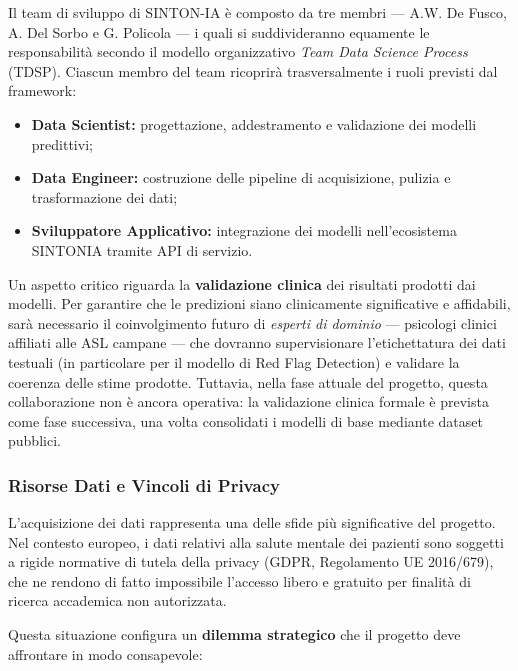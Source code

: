 Il team di sviluppo di SINTON-IA è composto da tre membri --- A.W. De Fusco, A. Del Sorbo e G. Policola --- i quali si suddivideranno equamente le responsabilità secondo il modello organizzativo \textit{Team Data Science Process} (TDSP). Ciascun membro del team ricoprirà trasversalmente i ruoli previsti dal framework:

\begin{itemize}
    \item \textbf{Data Scientist:} progettazione, addestramento e validazione dei modelli predittivi;
    \item \textbf{Data Engineer:} costruzione delle pipeline di acquisizione, pulizia e trasformazione dei dati;
    \item \textbf{Sviluppatore Applicativo:} integrazione dei modelli nell'ecosistema SINTONIA tramite API di servizio.
\end{itemize}

Un aspetto critico riguarda la \textbf{validazione clinica} dei risultati prodotti dai modelli. Per garantire che le predizioni siano clinicamente significative e affidabili, sarà necessario il coinvolgimento futuro di \textit{esperti di dominio} --- psicologi clinici affiliati alle ASL campane --- che dovranno supervisionare l'etichettatura dei dati testuali (in particolare per il modello di Red Flag Detection) e validare la coerenza delle stime prodotte. Tuttavia, nella fase attuale del progetto, questa collaborazione non è ancora operativa: la validazione clinica formale è prevista come fase successiva, una volta consolidati i modelli di base mediante dataset pubblici.

\subsubsection{Risorse Dati e Vincoli di Privacy}
\label{subsubsec:risorse_dati}

L'acquisizione dei dati rappresenta una delle sfide più significative del progetto. Nel contesto europeo, i dati relativi alla salute mentale dei pazienti sono soggetti a rigide normative di tutela della privacy (GDPR, Regolamento UE 2016/679), che ne rendono di fatto impossibile l'accesso libero e gratuito per finalità di ricerca accademica non autorizzata.

Questa situazione configura un \textbf{dilemma strategico} che il progetto deve affrontare in modo consapevole:

